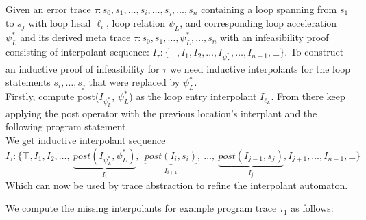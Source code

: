 \documentclass{article}
\newcounter{example}[section]
\begin{document}
    Given an error trace $\tau: s_0, s_1, \ldots , s_i, \ldots , s_j, \ldots , s_n$ containing a loop spanning from $s_1$ to $s_j$ with loop head $\ell_i$, loop relation $\psi_L$, and corresponding loop acceleration $\psi^*_{L}$ and its derived meta trace $\bar{\tau}: s_0, s_1, \ldots, \psi^*_{L}, \ldots , s_n$ with an infeasibility proof consisting of interpolant sequence: $I_{\bar{\tau}}: \{\top, I_1, I_2, \ldots , I_{\psi^*_{L}}, \ldots , I_{n-1}, \bot \}$. 
    To construct an inductive proof of infeasibility for $\tau$ we need inductive interpolants for the loop statements $s_i, \ldots , s_j$ that were replaced by $\psi^*_{L}$. \\
    Firstly, compute post($I_{\psi^*_L}$, $\psi^*_L$) as the loop entry interpolant $I_{\ell_L}$. From there keep applying the post operator with the previous location's interplant and the following program statement. \\
    We get inductive interpolant sequence
    \begin{equation*}
        I_\tau: \{\top,I_1,I_2, \ldots ,\ \underbrace{post(I_{\psi^*_L}, \psi^*_L)}_{I_{i}},\ \ \underbrace{post(I_{i}, s_i)}_{I_{i+1}},\ \ldots ,\ \underbrace{post(I_{j-1}, s_j)}_{I_{j}},I_{j+1}, \ldots ,I_{n-1}, \bot \}
    \end{equation*}
    Which can now be used by trace abstraction to refine the interpolant automaton.

We compute the missing interpolants for example program trace $\tau_1$ as follows:
\end{document}
